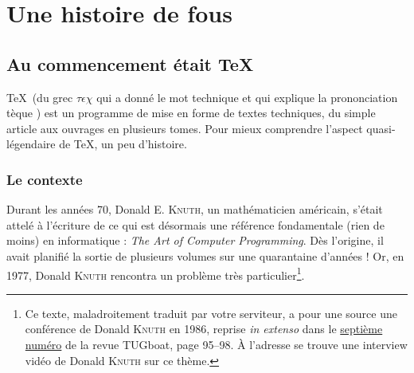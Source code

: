 
\chapter{Une histoire de fous}
\mtcaddchapter

\section{Au commencement était \TeX} 

\TeX\ (du grec $\tau \epsilon \chi$ qui a donné le mot \og technique \fg{} et qui explique la prononciation \og tèque \fg{}) est un programme de mise en forme de textes techniques, du simple article aux ouvrages en plusieurs tomes. Pour mieux comprendre l'aspect quasi-légendaire de \TeX, un peu d'histoire. 


\subsection{Le contexte}

Durant les années 70, Donald E. \textsc{Knuth}\cite{knut}, un mathématicien américain, s'était attelé à l'écriture de ce qui est désormais une référence fondamentale (rien de moins) en informatique : \emph{The Art of Computer Programming}. Dès l'origine, il avait planifié la sortie de plusieurs volumes sur une quarantaine d'années ! Or, en 1977, Donald \textsc{Knuth} rencontra un problème très particulier\footnote{Ce texte, maladroitement traduit par votre serviteur, a pour une source une conférence de Donald \textsc{Knuth} en 1986, reprise \emph{in extenso} dans le \href{http://www.tug.org/TUGboat/Contents/contents7-2.html}{septième numéro} de la revue TUGboat, page 95--98. \`{A} l'adresse  se trouve une interview vidéo de Donald \textsc{Knuth} sur ce thème.}.

